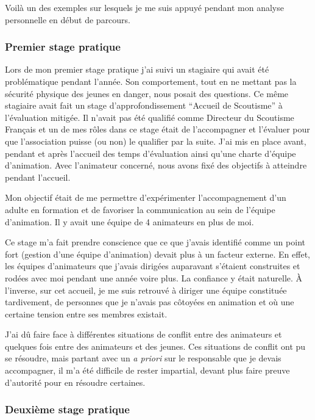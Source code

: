 \documentclass[titlepage,11pt,a4paper]{article}
\begin{document}
Voilà un des exemples sur lesquels je me suis appuyé pendant mon analyse personnelle en
début de parcours.

\subsubsection{Premier stage pratique}

Lors de mon premier stage pratique j'ai suivi un stagiaire qui avait été problématique pendant
l'année. Son comportement, tout en ne mettant pas la sécurité physique des jeunes en danger,
nous posait des questions. Ce même stagiaire avait fait un stage d'approfondissement
``Accueil de Scoutisme'' à l'évaluation mitigée. Il n'avait pas été qualifié comme Directeur du Scoutisme Français et
un de mes rôles dans ce stage était de l'accompagner et l'évaluer pour que l'association puisse (ou
non) le qualifier par la suite. J'ai mis en place avant, pendant et après l'accueil des
temps d'évaluation ainsi qu'une charte d'équipe d'animation. Avec l'animateur concerné,
nous avons fixé des objectifs à atteindre pendant l'accueil.

Mon objectif était de me permettre d'expérimenter l'accompagnement d'un
adulte en formation et de favoriser la communication au sein de l'équipe d'animation. Il y
avait une équipe de 4 animateurs en plus de moi.

Ce stage m'a fait prendre conscience que ce que j'avais identifié comme un point fort
(gestion d'une équipe d'animation) devait plus à un facteur externe. En effet, les équipes
d'animateurs que j'avais dirigées auparavant s'étaient construites et rodées avec moi pendant
une année voire plus. La confiance y était naturelle. À l'inverse, sur cet accueil,
je me suis retrouvé à diriger une équipe constituée tardivement, de personnes que
je n'avais pas côtoyées en animation et où une certaine tension entre ses membres
existait.

J'ai dû faire face à différentes situations de conflit entre des
animateurs et quelques fois entre des animateurs et des jeunes. Ces situations de conflit
ont pu se résoudre, mais partant avec un \textit{a priori} sur le responsable que je
devais accompagner, il m'a été difficile de rester impartial, devant plus faire preuve
d'autorité pour en résoudre certaines.

\subsubsection{Deuxième stage pratique}
\end{document}
